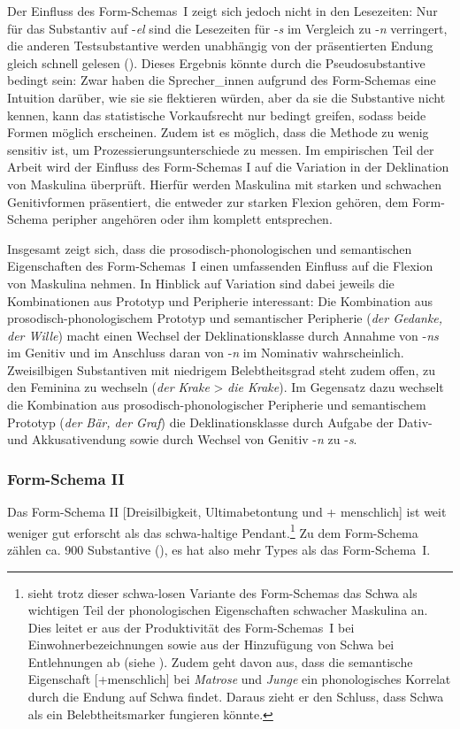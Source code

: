 Der Einfluss des Form-Schemas~I zeigt sich jedoch nicht in den Lesezeiten: Nur für das Substantiv auf -\textit{el} sind die Lesezeiten für -\textit{s} im Vergleich zu -\textit{n} verringert, die anderen Testsubstantive werden unabhängig von der präsentierten Endung gleich schnell gelesen (\cite[169--171]{Schmitt.2019}). Dieses Ergebnis könnte durch die Pseudosubstantive bedingt sein: Zwar haben die Sprecher\_innen aufgrund des Form-Schemas eine Intuition darüber, wie sie sie flektieren würden, aber da sie die Substantive nicht kennen, kann das statistische Vorkaufsrecht nur bedingt greifen, sodass beide Formen möglich erscheinen. Zudem ist es möglich, dass die Methode zu wenig sensitiv ist, um Prozessierungsunterschiede zu messen. Im empirischen Teil der Arbeit wird der Einfluss des Form-Schemas I auf die Variation in der Deklination von Maskulina überprüft. Hierfür werden Maskulina mit starken und schwachen Genitivformen präsentiert, die entweder zur starken Flexion gehören, dem Form-Schema peripher angehören oder ihm komplett entsprechen.   

Insgesamt zeigt sich, dass die prosodisch-phonologischen und semantischen Eigenschaften des Form-Schemas~I einen umfassenden Einfluss auf die Flexion von Maskulina nehmen. In Hinblick auf Variation sind dabei jeweils die Kombinationen aus Prototyp und Peripherie interessant: Die Kombination aus prosodisch-phonologischem Prototyp und semantischer Peripherie (\textit{der Gedanke, der Wille}) macht einen Wechsel der Deklinationsklasse durch Annahme von -\textit{ns} im Genitiv und im Anschluss daran von -\textit{n} im Nominativ wahrscheinlich. Zweisilbigen Substantiven mit niedrigem Belebtheitsgrad steht zudem offen, zu den Feminina zu wechseln (\textit{der Krake} > \textit{die Krake}). Im Gegensatz dazu wechselt die Kombination aus prosodisch-phonologischer Peripherie und semantischem Prototyp (\textit{der Bär, der Graf}) die Deklinationsklasse durch Aufgabe der Dativ- und Akkusativendung sowie durch Wechsel von Genitiv -\textit{n} zu -\textit{s}. 

 


\subsubsection{Form-Schema II}\label{sch2}\largerpage[1.5]

Das Form-Schema II [Dreisilbigkeit, Ultimabetontung und + menschlich] ist weit weniger gut erforscht als das schwa-haltige Pendant.\footnote{\textcite[176]{Kopcke.1995} sieht trotz dieser schwa-losen Variante des Form-Schemas das Schwa als wichtigen Teil der phonologischen Eigenschaften schwacher Maskulina an. Dies leitet er aus der Produktivität des Form-Schemas~I bei Einwohnerbezeichnungen sowie aus der Hinzufügung von Schwa bei Entlehnungen ab (siehe ). Zudem geht \textcite[75]{Kopcke.2005} davon aus, dass die semantische Eigenschaft [+menschlich] bei \textit{Matrose} und \textit{Junge} ein phonologisches Korrelat durch die Endung auf Schwa findet. Daraus zieht er den Schluss, dass Schwa als ein Belebtheitsmarker fungieren könnte.} Zu dem Form-Schema zählen ca. 900 Substantive (\cite[98--99]{Bittner.20031991}), es hat also mehr Types als das Form-Schema~I. 



